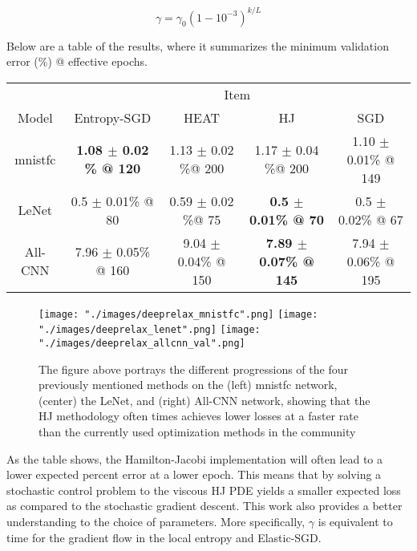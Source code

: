 $$\gamma = \gamma_0 (1-10^{-3})^{k/L}$$

Below are a table of the results, where it summarizes the minimum validation error (\%) @ effective epochs.

\begin{center}
    \begin{tabular}{c c c c c}
        \hline
        & \multicolumn{4}{c}{Item} \\
        \cline{2-5}
        Model & Entropy-SGD & HEAT & HJ & SGD \\
        \hline
        mnistfc & \textbf{1.08 $\pm$ 0.02 \% @ 120} & 1.13 $\pm$ 0.02 \%@ 200 & 1.17 $\pm$ 0.04 \%@ 200 & 1.10 $\pm$ 0.01\% @ 149 \\
        LeNet & 0.5 $\pm$ 0.01\% @ 80 & 0.59 $\pm$ 0.02 \%@ 75 & \textbf{0.5 $\pm$ 0.01\% @ 70 } & 0.5 $\pm$ 0.02\% @ 67 \\
        All-CNN & 7.96 $\pm$ 0.05\% @ 160 & 9.04 $\pm$ 0.04\% @ 150 & \textbf{7.89 $\pm$ 0.07\% @ 145 } & 7.94 $\pm$ 0.06\% @ 195
    \end{tabular}
\end{center}

\begin{figure}[ht]
\begin{center}
    \texttt{[image: "./images/deeprelax\_mnistfc".png]}
    \texttt{[image: "./images/deeprelax\_lenet".png]}
    \texttt{[image: "./images/deeprelax\_allcnn\_val".png]}
    \caption{The figure above portrays the different progressions of the four previously mentioned methods on the (left) mnistfc network, (center) the LeNet, and (right) All-CNN network, showing that the HJ methodology often times achieves lower losses at a faster rate than the currently used optimization methods in the community}
    \label{fig::model_neuron}
\end{center}
\end{figure}

As the table shows, the Hamilton-Jacobi implementation will often lead to a lower expected percent error at a lower epoch. This means that by solving a stochastic control problem to the viscous HJ PDE yields a smaller expected loss as compared to the stochastic gradient descent. This work also provides a better understanding to the choice of parameters. More specifically, $\gamma$ is equivalent to time for the gradient flow in the local entropy and Elastic-SGD.


